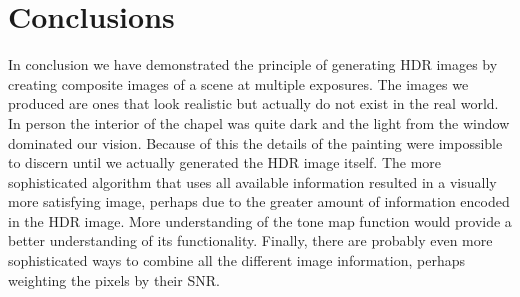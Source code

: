 \documentclass[a4paper]{article}
\begin{document}
\section{Conclusions}
In conclusion we have demonstrated the principle of generating HDR images by creating composite images of a scene at multiple exposures.  The images we produced are ones that look realistic but actually do not exist in the real world.  In person the interior of the chapel was quite dark and the light from the window dominated our vision.  Because of this the details of the painting were impossible to discern until we actually generated the HDR image itself.  The more sophisticated  algorithm that uses all available information resulted in a visually more satisfying image, perhaps due to the greater amount of information encoded in the HDR image. More understanding of the tone map function would provide a better understanding of its functionality.  Finally, there are probably even more sophisticated ways to combine all the different image information, perhaps weighting the pixels by their SNR.  

\end{document}
